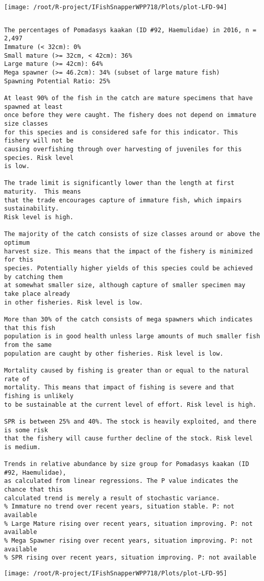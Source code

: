 \documentclass{report}\usepackage[]{graphicx}\usepackage[]{color}
\makeatletter
\def\maxwidth{ %
  \ifdim\Gin@nat@width>\linewidth
    \linewidth
  \else
    \Gin@nat@width
  \fi
}
\newenvironment{kframe}{%
 \def\at@end@of@kframe{}%
 \ifinner\ifhmode%
  \def\at@end@of@kframe{\end{minipage}}%
  \begin{minipage}{\columnwidth}%
 \fi\fi%
 \def\FrameCommand##1{\hskip\@totalleftmargin \hskip-\fboxsep
 \colorbox{shadecolor}{##1}\hskip-\fboxsep
     \hskip-\linewidth \hskip-\@totalleftmargin \hskip\columnwidth}%
 \MakeFramed {\advance\hsize-\width
   \@totalleftmargin\z@ \linewidth\hsize
   \@setminipage}}%
 {\par\unskip\endMakeFramed%
 \at@end@of@kframe}
\newenvironment{knitrout}{}{} %
\makeatother
\begin{document}
\begin{knitrout}
\texttt{[image: /root/R-project/IFishSnapperWPP718/Plots/plot-LFD-94]} 
\begin{kframe}\begin{verbatim}
\end{verbatim}
\end{kframe}
\clearpage
\newpage
\begin{kframe}\begin{verbatim}The percentages of Pomadasys kaakan (ID #92, Haemulidae) in 2016, n = 2,497
Immature (< 32cm): 0%
Small mature (>= 32cm, < 42cm): 36%
Large mature (>= 42cm): 64%
Mega spawner (>= 46.2cm): 34% (subset of large mature fish)
Spawning Potential Ratio: 25%
 
At least 90% of the fish in the catch are mature specimens that have spawned at least
once before they were caught. The fishery does not depend on immature size classes
for this species and is considered safe for this indicator. This fishery will not be
causing overfishing through over harvesting of juveniles for this species. Risk level
is low.

The trade limit is significantly lower than the length at first maturity.  This means
that the trade encourages capture of immature fish, which impairs sustainability.
Risk level is high.

The majority of the catch consists of size classes around or above the optimum
harvest size. This means that the impact of the fishery is minimized for this
species. Potentially higher yields of this species could be achieved by catching them
at somewhat smaller size, although capture of smaller specimen may take place already
in other fisheries. Risk level is low.

More than 30% of the catch consists of mega spawners which indicates that this fish
population is in good health unless large amounts of much smaller fish from the same
population are caught by other fisheries. Risk level is low.
 
Mortality caused by fishing is greater than or equal to the natural rate of
mortality. This means that impact of fishing is severe and that fishing is unlikely
to be sustainable at the current level of effort. Risk level is high.
 
SPR is between 25% and 40%. The stock is heavily exploited, and there is some risk
that the fishery will cause further decline of the stock. Risk level is medium.
 
Trends in relative abundance by size group for Pomadasys kaakan (ID #92, Haemulidae),
as calculated from linear regressions. The P value indicates the chance that this
calculated trend is merely a result of stochastic variance.
% Immature no trend over recent years, situation stable. P: not available
% Large Mature rising over recent years, situation improving. P: not available
% Mega Spawner rising over recent years, situation improving. P: not available
% SPR rising over recent years, situation improving. P: not available
\end{verbatim}
\end{kframe}
\texttt{[image: /root/R-project/IFishSnapperWPP718/Plots/plot-LFD-95]} 


\end{knitrout}
\end{document}
